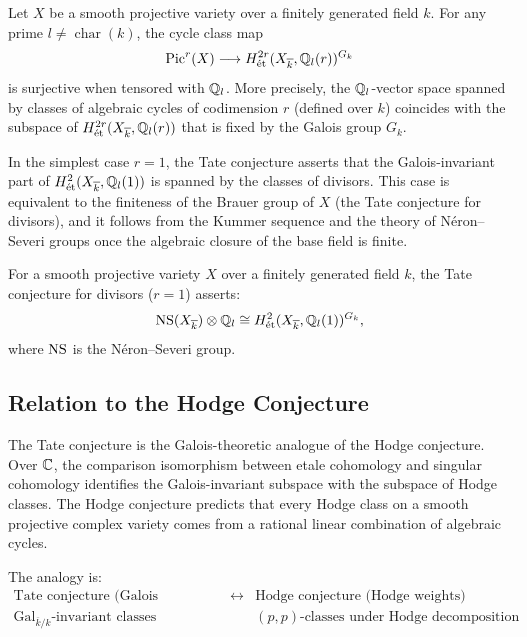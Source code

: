 \begin{conjecture}
Let \(X\) be a smooth projective variety over a finitely generated field \(k\). For any prime \(l \neq \operatorname{char}(k)\), the cycle class map
\[
\operatorname{Pic}^r(X) \longrightarrow H^{2r}_{\text{\'et}}(X_{\overline{k}}, \mathbb{Q}_l(r))^{G_k}
\]
is surjective when tensored with \(\mathbb{Q}_l\). More precisely, the \(\mathbb{Q}_l\)-vector space spanned by classes of algebraic cycles of codimension \(r\) (defined over \(k\)) coincides with the subspace of \(H^{2r}_{\text{\'et}}(X_{\overline{k}}, \mathbb{Q}_l(r))\) that is fixed by the Galois group \(G_k\).
\end{conjecture}

In the simplest case \(r = 1\), the Tate conjecture asserts that the Galois-invariant part of \(H^2_{\text{\'et}}(X_{\overline{k}}, \mathbb{Q}_l(1))\) is spanned by the classes of divisors. This case is equivalent to the finiteness of the Brauer group of \(X\) (the Tate conjecture for divisors), and it follows from the Kummer sequence and the theory of N\'eron--Severi groups once the algebraic closure of the base field is finite.

\begin{definition}
For a smooth projective variety \(X\) over a finitely generated field \(k\), the Tate conjecture for divisors (\(r=1\)) asserts:
\[
\operatorname{NS}(X_{\overline{k}}) \otimes \mathbb{Q}_l \cong H^2_{\text{\'et}}(X_{\overline{k}}, \mathbb{Q}_l(1))^{G_k},
\]
where \(\operatorname{NS}\) is the N\'eron--Severi group.
\end{definition}

\subsection{Relation to the Hodge Conjecture}

The Tate conjecture is the Galois-theoretic analogue of the Hodge conjecture. Over \(\mathbb{C}\), the comparison isomorphism between etale cohomology and singular cohomology identifies the Galois-invariant subspace with the subspace of Hodge classes. The Hodge conjecture predicts that every Hodge class on a smooth projective complex variety comes from a rational linear combination of algebraic cycles.

The analogy is:
\[
\begin{array}{ccc}
\text{Tate conjecture (Galois invariance)} & \longleftrightarrow & \text{Hodge conjecture (Hodge weights)} \\
\text{Gal}_{\overline{k}/k}\text{-invariant classes} & & (p,p)\text{-classes under Hodge decomposition}
\end{array}
\]

